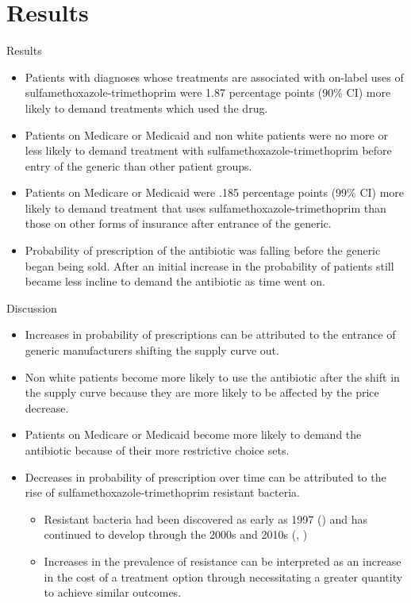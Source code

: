 \documentclass{beamer}
\begin{document}
\section{Results}
\begin{frame}{Results}
\begin{itemize}
\item Patients with diagnoses whose treatments are associated with on-label uses of sulfamethoxazole-trimethoprim were 1.87 percentage points (90\% CI) more likely to demand treatments which used the drug.
\item Patients on Medicare or Medicaid and non white patients were no more or less likely to demand treatment with sulfamethoxazole-trimethoprim before entry of the generic than other patient groups.
\item Patients on Medicare or Medicaid were .185 percentage points (99\% CI) more likely to demand treatment that uses sulfamethoxazole-trimethoprim than those on other forms of insurance after entrance of the generic.
\item Probability of prescription of the antibiotic was falling before the generic began being sold. After an initial increase in the probability of patients still became less incline to demand the antibiotic as time went on.
\end{itemize}
\end{frame}

\begin{frame}{Discussion}
\begin{itemize}
\item Increases in probability of prescriptions can be attributed to the entrance of generic manufacturers shifting the supply curve out. 
\item Non white patients become more likely to use the antibiotic after the shift in the supply curve because they are more likely to be affected by the price decrease.
\item Patients on Medicare or Medicaid become more likely to demand the antibiotic because of their more restrictive choice sets.
\item  Decreases in probability of prescription over time can be attributed to the rise of sulfamethoxazole-trimethoprim resistant bacteria.
\begin{itemize}
  \item Resistant bacteria had been discovered as early as 1997 (\cite{gales_urinary_2002}) and has continued to develop through the 2000s and 2010s (\cite{noauthor_resistance_nodate}, \cite{khamash_increasing_2019})
  \item Increases in the prevalence of resistance can be interpreted as an increase in the cost of a treatment option through necessitating a greater quantity to achieve similar outcomes.
\end{itemize}
\end{itemize}
\end{frame}
\end{document}
